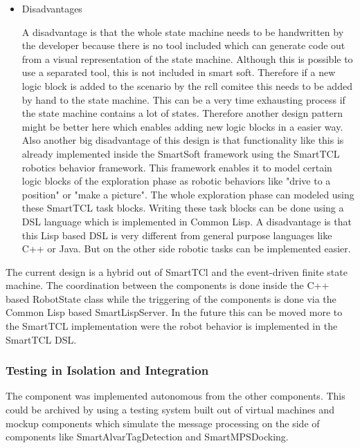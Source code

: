 \begin{itemize}
\item Disadvantages

A disadvantage is that the whole state machine needs to be handwritten by the developer because there is no tool included which can generate code out from a visual representation 
of the state machine. Although this is possible to use a separated tool, this is not included in smart soft. Therefore if a new logic block is added to the scenario by the rcll comitee this needs to be added by hand to the state machine. This can be a very time exhausting process if the state machine contains a lot of states. Therefore another design pattern might be better here which enables adding new logic blocks in a easier way. \\

Also another big disadvantage of this design is that functionality like this is already implemented inside the SmartSoft framework using the SmartTCL robotics behavior framework.
This framework enables it to model certain logic blocks of the exploration phase as robotic behaviors like "drive to a position" or "make a picture". The whole exploration phase can modeled using these SmartTCL task blocks. Writing these task blocks can be done using a DSL language which is implemented in Common Lisp. A disadvantage is that this Lisp based DSL is 
very different from general purpose languages like C++ or Java. But on the other side robotic tasks can be implemented easier. 


\end{itemize}


The current design is a hybrid out of SmartTCl and the event-driven finite state machine. The coordination between the components is done inside the C++ based RobotState class while the
triggering of the components is done via the Common Lisp based SmartLispServer. In the future this can be moved more to the SmartTCL implementation were the robot behavior is implemented in the SmartTCL DSL. 


\subsubsection{Testing in Isolation and Integration}

The component was implemented autonomous from the other components. This could be archived by using a testing system built out of virtual machines and mockup components which simulate the message processing on the side of components like SmartAlvarTagDetection and SmartMPSDocking. \\

